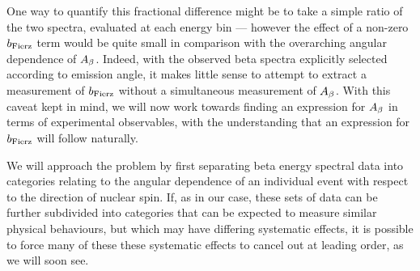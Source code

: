One way to quantify this fractional difference might be to take a simple ratio of the two spectra, evaluated at each energy bin --- however the effect of a non-zero $b_{\mathrm{Fierz}}$ term would be quite small in comparison with the overarching angular dependence of $A_{\beta}$.  Indeed, with the observed beta spectra explicitly selected according to emission angle, it makes little sense to attempt to extract a measurement of $b_{\mathrm{Fierz}}$ without a simultaneous measurement of $A_{\beta}$.  With this caveat kept in mind, we will now work towards finding an expression for $A_{\beta}$ in terms of experimental observables, with the understanding that an expression for $b_{\mathrm{Fierz}}$ will follow naturally.  

We will approach the problem by first separating beta energy spectral data into categories relating to the angular dependence of an individual event with respect to the direction of nuclear spin.  %
If, as in our case, these sets of data can be further subdivided into categories that can be expected to measure similar physical behaviours, but which may have differing systematic effects, it is possible to force many of these these systematic effects to cancel out at leading order, as we will soon see.  

